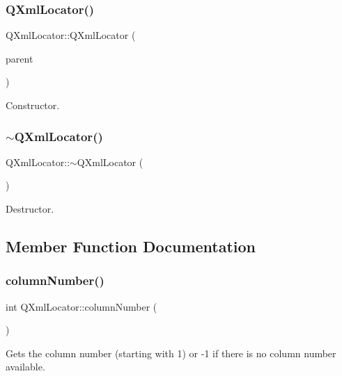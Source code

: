 \subsubsection{\texorpdfstring{QXmlLocator()}{QXmlLocator()}}
{\footnotesize\ttfamily Q\+Xml\+Locator\+::\+Q\+Xml\+Locator (\begin{DoxyParamCaption}\item[{\mbox{\hyperlink{class_q_xml_simple_reader}{Q\+Xml\+Simple\+Reader}} $\ast$}]{parent }\end{DoxyParamCaption})\hspace{0.3cm}{\ttfamily [inline]}}

Constructor. \mbox{\label{class_q_xml_locator_a5c25ab17eea78be183aab4ff21ce3c17}} 
\subsubsection{\texorpdfstring{$\sim$QXmlLocator()}{~QXmlLocator()}}
{\footnotesize\ttfamily Q\+Xml\+Locator\+::$\sim$\+Q\+Xml\+Locator (\begin{DoxyParamCaption}{ }\end{DoxyParamCaption})\hspace{0.3cm}{\ttfamily [inline]}}

Destructor. 

\subsection{Member Function Documentation}
\mbox{\label{class_q_xml_locator_a5f4b33431fe65b3fb4fa4f822aa384f4}} 
\subsubsection{\texorpdfstring{columnNumber()}{columnNumber()}}
{\footnotesize\ttfamily int Q\+Xml\+Locator\+::column\+Number (\begin{DoxyParamCaption}{ }\end{DoxyParamCaption})}

Gets the column number (starting with 1) or -\/1 if there is no column number available. \mbox{\label{class_q_xml_locator_ac595643330832dfa1222eac90ebc5fe7}} 
